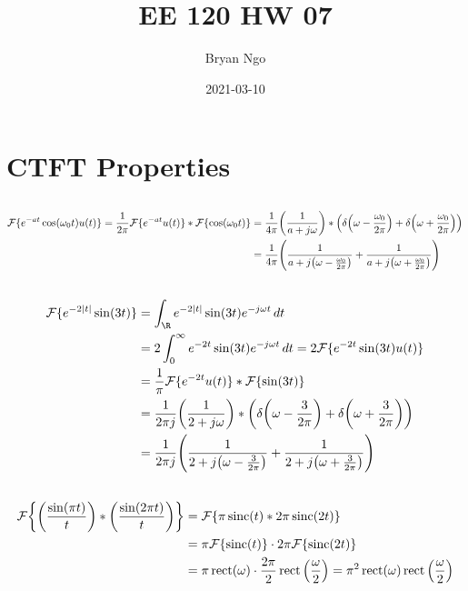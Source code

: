 \documentclass{article}
\title{EE 120 HW 07}
\author{Bryan Ngo}
\date{2021-03-10}
\newcommand{\F}{\mathcal{F}}
\newcommand{\sinc}{\operatorname{sinc}}
\newcommand{\rect}{\operatorname{rect}}
\begin{document}
\maketitle

\section{CTFT Properties}

\subsection{}

\begin{align}
    \F\{e^{-at} \cos(\omega_0 t) u(t)\} = \frac{1}{2\pi} \F\{e^{-at} u(t)\} \ast \F\{\cos(\omega_0 t)\} &= \frac{1}{4\pi} \qty(\frac{1}{a + j \omega}) \ast \qty(\delta\qty(\omega - \frac{\omega_0}{2\pi}) + \delta\qty(\omega + \frac{\omega_0}{2\pi})) \\
    &= \frac{1}{4\pi} \qty(\frac{1}{a + j \qty(\omega - \frac{\omega_0}{2\pi})} + \frac{1}{a + j \qty(\omega + \frac{\omega_0}{2\pi})})
\end{align}

\subsection{}

\begin{align}
    \F\{e^{-2 |t|} \sin(3t)\} &= \int_{\R} e^{-2 |t|} \sin(3t) e^{-j \omega t} \, dt \\
    &= 2 \int_0^\infty e^{-2t} \sin(3t) e^{-j \omega t} \, dt = 2\F\{e^{-2t} \sin(3t) u(t)\} \\
    &= \frac{1}{\pi} \F\{e^{-2t} u(t)\} \ast \F\{\sin(3t)\} \\
    &= \frac{1}{2\pi j} \qty(\frac{1}{2 + j \omega}) \ast \qty(\delta\qty(\omega - \frac{3}{2\pi}) + \delta\qty(\omega + \frac{3}{2\pi})) \\
    &= \frac{1}{2\pi j} \qty(\frac{1}{2 + j \qty(\omega - \frac{3}{2\pi})} + \frac{1}{2 + j \qty(\omega + \frac{3}{2\pi})})
\end{align}

\subsection{}

\begin{align}
    \F\qty{\qty(\frac{\sin(\pi t)}{t}) \ast \qty(\frac{\sin(2\pi t)}{t})} &= \F\{\pi \sinc(t) \ast 2\pi \sinc(2t)\} \\
    &= \pi \F\{\sinc(t)\} \cdot 2\pi \F\{\sinc(2t)\} \\
    &= \pi \rect(\omega) \cdot \frac{2\pi}{2} \rect\qty(\frac{\omega}{2}) = \pi^2 \rect(\omega) \rect\qty(\frac{\omega}{2})
\end{align}
\end{document}
